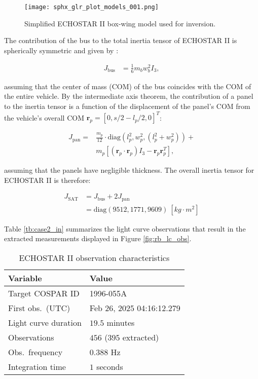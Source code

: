 \documentclass[a4paper,twocolumn]{spaceDebrisC} %
\newcommand{\vctr}[1]{\bm{#1}}
\newcommand{\figbig}[0]{0.5\textwidth}
\begin{document}
\begin{figure}[H]
  \centering
  \texttt{[image: sphx\_glr\_plot\_models\_001.png]}
  \caption{Simplified ECHOSTAR II box-wing model used for inversion.}
  \label{fig:echostar1_simple}
\end{figure}

The contribution of the bus to the total inertia tensor of ECHOSTAR II is spherically symmetric and given by \cite{satterly1958}:

\begin{align}
 J_\text{bus} &= \frac{1}{6} m_b w_b^2 I_3,
\end{align}

\noindent
assuming that the center of mass (COM) of the bus coincides with the COM of the entire vehicle. By the intermediate axis theorem, the contribution of a panel to the inertia tensor is a function of the displacement of the panel's COM from the vehicle's overall COM $\vctr{r}_p = [ 0, s/2 - l_p/2, 0]^T$:

\begin{equation}
  \begin{split}
 J_\text{pan} = &\frac{m_p}{12} \cdot \text{diag}\left(l_p^2, w_p^2, \left(l_p^2 + w_p^2\right) \right) + \\&m_p \left[ \left( \vctr{r}_p \cdot \vctr{r}_p \right) I_3 - \vctr{r}_p \vctr{r}_p^T \right],
  \end{split}
\end{equation}

\noindent
assuming that the panels have negligible thickness. The overall inertia tensor for ECHOSTAR II is therefore:

\begin{align}
 J_\text{SAT} &= J_\text{bus} + 2J_\text{pan} \\
  &= \text{diag} \left( 9512, 1771, 9609 \right) \: [kg \cdot m^2]
\end{align}

Table \ref{tb:case2_in} summarizes the light curve observations that result in the extracted measurements displayed in Figure \ref{fig:rb_lc_obs}.

\begin{table}[H]
  \centering
  \caption{ECHOSTAR II observation characteristics}
  \vspace*{6pt}
  \begin{tabular}{|l|l|}
  \hline
  \textbf{Variable} & \textbf{Value} \\ \hline
 Target COSPAR ID & 1996-055A \\ \hline
 First obs.\ (UTC) & Feb 26, 2025 04:16:12.279 \\ \hline
 Light curve duration & $19.5$ minutes \\ \hline
 Observations & $456$ ($395$ extracted) \\ \hline
 Obs.\ frequency & $0.388$ Hz \\ \hline
 Integration time & $1$ seconds \\ \hline
  \end{tabular}
  \label{tb:case3_in}
\end{table}
\end{document}
